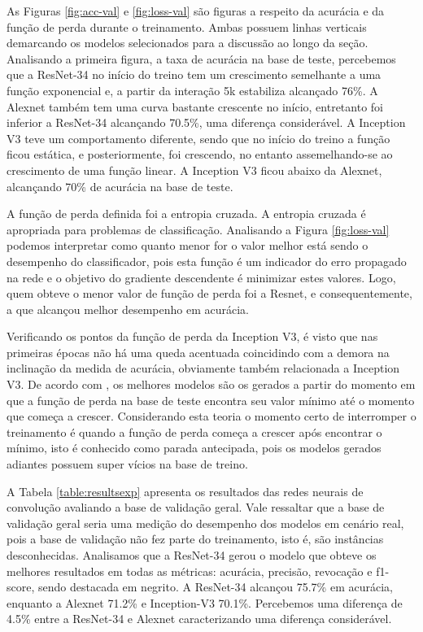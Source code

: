As Figuras \ref{fig:acc-val} e \ref{fig:loss-val} são figuras a respeito da acurácia e da função de perda durante o treinamento. Ambas possuem linhas verticais demarcando os modelos selecionados para a discussão ao longo da seção. Analisando a primeira figura, a taxa de acurácia na base de teste, percebemos que a ResNet-34 no início do treino tem um crescimento semelhante a uma função exponencial e, a partir da interação 5k estabiliza alcançado 76\%. A Alexnet também tem uma curva bastante crescente no início, entretanto foi inferior a ResNet-34 alcançando 70.5\%, uma diferença considerável. A Inception V3 teve um comportamento diferente, sendo que no início do treino a função ficou estática, e posteriormente, foi crescendo, no entanto assemelhando-se ao crescimento de uma função linear. A Inception V3 ficou abaixo da Alexnet, alcançando 70\% de acurácia na base de teste. 

A função de perda definida foi a entropia cruzada. A entropia cruzada é apropriada para problemas de classificação. Analisando a Figura \ref{fig:loss-val} podemos interpretar como quanto menor for o valor melhor está sendo o desempenho do classificador, pois esta função é um indicador do erro propagado na rede e o objetivo do gradiente descendente é minimizar estes valores. Logo, quem obteve o menor valor de função de perda foi a Resnet, e consequentemente, a que alcançou melhor desempenho em acurácia. 

Verificando os pontos da função de perda da Inception V3, é visto que nas primeiras épocas não há uma queda acentuada coincidindo com a demora na inclinação da medida de acurácia, obviamente também relacionada a Inception V3. De acordo com \cite{geron2017hands}, os melhores modelos são os gerados a partir do momento em que a função de perda na base de teste encontra seu valor mínimo até o momento que começa a crescer. Considerando esta teoria o momento certo de interromper o treinamento é quando a função de perda começa a crescer após encontrar o mínimo, isto é conhecido como parada antecipada, pois os modelos gerados adiantes possuem super vícios na base de treino.

A Tabela \ref{table:resultsexp} apresenta os resultados das redes neurais de convolução avaliando a base de validação geral. Vale ressaltar que a base de validação geral seria uma medição do desempenho dos modelos em cenário real, pois a base de validação não fez parte do treinamento, isto é, são instâncias desconhecidas. Analisamos que a ResNet-34 gerou o modelo que obteve os melhores resultados em todas as métricas: acurácia, precisão, revocação e f1-score, sendo destacada em negrito. A ResNet-34 alcançou 75.7\% em acurácia, enquanto a Alexnet 71.2\% e Inception-V3 70.1\%. Percebemos uma diferença de 4.5\% entre a ResNet-34 e Alexnet caracterizando uma diferença considerável. 

